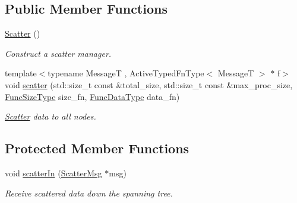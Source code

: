 \subsection*{Public Member Functions}
\begin{DoxyCompactItemize}
\item 
\hyperlink{structvt_1_1collective_1_1scatter_1_1_scatter_a33ea9a78c5d43dcea4ec2cb69d8b00b4}{Scatter} ()
\begin{DoxyCompactList}\small\item\em Construct a scatter manager. \end{DoxyCompactList}\item 
{\footnotesize template$<$typename MessageT , Active\+Typed\+Fn\+Type$<$ Message\+T $>$ $\ast$ f$>$ }\\void \hyperlink{structvt_1_1collective_1_1scatter_1_1_scatter_a0873f5fd4b890ad95e6ed6c097efe8bd}{scatter} (std\+::size\+\_\+t const \&total\+\_\+size, std\+::size\+\_\+t const \&max\+\_\+proc\+\_\+size, \hyperlink{structvt_1_1collective_1_1scatter_1_1_scatter_a977d895e42999a4078c6705ac851f447}{Func\+Size\+Type} size\+\_\+fn, \hyperlink{structvt_1_1collective_1_1scatter_1_1_scatter_a4040244e8ed36afd5d408c27efceea1b}{Func\+Data\+Type} data\+\_\+fn)
\begin{DoxyCompactList}\small\item\em \hyperlink{structvt_1_1collective_1_1scatter_1_1_scatter}{Scatter} data to all nodes. \end{DoxyCompactList}\end{DoxyCompactItemize}
\subsection*{Protected Member Functions}
\begin{DoxyCompactItemize}
\item 
void \hyperlink{structvt_1_1collective_1_1scatter_1_1_scatter_aa80a957377cce3126058f3d7d30d2fed}{scatter\+In} (\hyperlink{structvt_1_1collective_1_1scatter_1_1_scatter_msg}{Scatter\+Msg} $\ast$msg)
\begin{DoxyCompactList}\small\item\em Receive scattered data down the spanning tree. \end{DoxyCompactList}\end{DoxyCompactItemize}
